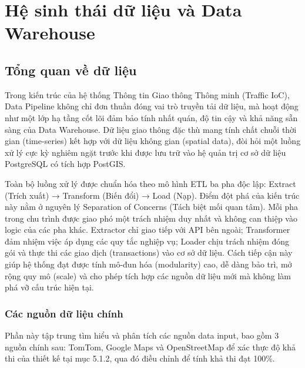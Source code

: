 \section{Hệ sinh thái dữ liệu và Data Warehouse}
\subsection{Tổng quan về dữ liệu}
Trong kiến trúc của hệ thống Thông tin Giao thông Thông minh (Traffic IoC), Data Pipeline không chỉ đơn thuần đóng vai trò truyền tải dữ liệu, mà hoạt động như một lớp hạ tầng cốt lõi đảm bảo tính nhất quán, độ tin cậy và khả năng sẵn sàng của Data Warehouse. Dữ liệu giao thông đặc thù mang tính chất chuỗi thời gian (time-series) kết hợp với dữ liệu không gian (spatial data), đòi hỏi một luồng xử lý cực kỳ nghiêm ngặt trước khi được lưu trữ vào hệ quản trị cơ sở dữ liệu PostgreSQL có tích hợp PostGIS.


Toàn bộ luồng xử lý được chuẩn hóa theo mô hình ETL ba pha độc lập: Extract (Trích xuất) → Transform (Biến đổi) → Load (Nạp). Điểm đột phá của kiến trúc này nằm ở nguyên lý Separation of Concerns (Tách biệt mối quan tâm). Mỗi pha trong chu trình được giao phó một trách nhiệm duy nhất và không can thiệp vào logic của các pha khác. Extractor chỉ giao tiếp với API bên ngoài; Transformer đảm nhiệm việc áp dụng các quy tắc nghiệp vụ; Loader chịu trách nhiệm đóng gói và thực thi các giao dịch (transactions) vào cơ sở dữ liệu. Cách tiếp cận này giúp hệ thống đạt được tính mô-đun hóa (modularity) cao, dễ dàng bảo trì, mở rộng quy mô (scale) và cho phép tích hợp các nguồn dữ liệu mới mà không làm phá vỡ cấu trúc hiện tại.

\subsubsection{Các nguồn dữ liệu chính}
Phần này tập trung tìm hiểu và phân tích các nguồn data input, bao gồm 3 nguồn chính sau: TomTom, Google Maps và OpenStreetMap để xác thực độ khả thi của thiết kế tại mục 5.1.2, qua đó điều chỉnh để tính khả thi đạt 100\%.


